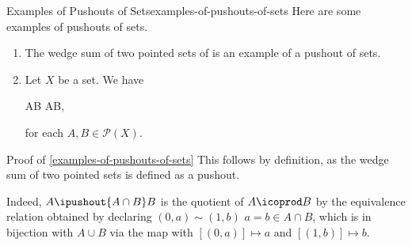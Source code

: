 \begin{example}{Examples of Pushouts of Sets}{examples-of-pushouts-of-sets}%
    Here are some examples of pushouts of sets.
    \begin{enumerate}
        \item\label{examples-of-pushouts-of-sets-wedge-sums-of-pointed-sets}The wedge sum of two pointed sets of  is an example of a pushout of sets.
        \item\label{examples-of-pushouts-of-sets-intersections-via-unions}Let $X$ be a set. We have
            \begin{webcompile}
                A\cup B%
                \cong%
                AB,%
                \quad
            \end{webcompile}
            for each $A,B\in\mathcal{P}(X)$.
    \end{enumerate}
\end{example}
\begin{Proof}{Proof of \cref{examples-of-pushouts-of-sets}}%
    This follows by definition, as the wedge sum of two pointed sets is defined as a pushout.

    Indeed, $A\ipushout{A\cap B}B$ is the quotient of $A\icoprod B$ by the equivalence relation obtained by declaring $(0,a)\sim(1,b)$ \textiff $a=b\in A\cap B$, which is in bijection with $A\cup B$ via the map with $[(0,a)]\mapsto a$ and $[(1,b)]\mapsto b$.
\end{Proof}
